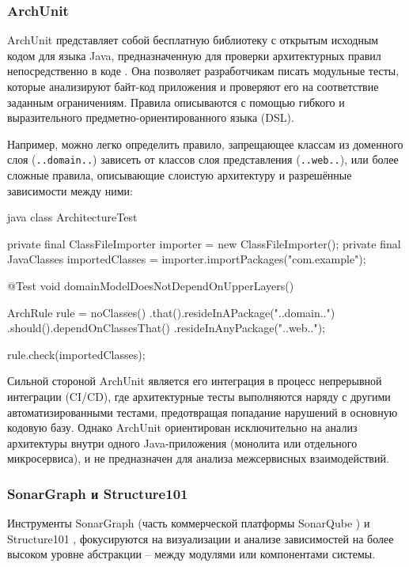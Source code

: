\subsubsection{ArchUnit}

ArchUnit представляет собой бесплатную библиотеку с открытым исходным кодом для языка Java, предназначенную для проверки архитектурных правил непосредственно в коде \cite{archunit-site}. Она позволяет разработчикам писать модульные тесты, которые анализируют байт-код приложения и проверяют его на соответствие заданным ограничениям. Правила описываются с помощью гибкого и выразительного предметно-ориентированного языка (DSL).

Например, можно легко определить правило, запрещающее классам из доменного слоя (\verb|..domain..|) зависеть от классов слоя представления (\verb|..web..|), или более сложные правила, описывающие слоистую архитектуру и разрешённые зависимости между ними:

\begin{code}{java}
class ArchitectureTest {
    private final ClassFileImporter importer = 
            new ClassFileImporter();
    private final JavaClasses importedClasses =
            importer.importPackages("com.example");

    @Test
    void domainModelDoesNotDependOnUpperLayers() {
        ArchRule rule = noClasses()
                .that().resideInAPackage("..domain..")
                .should().dependOnClassesThat()
                .resideInAnyPackage("..web..");

        rule.check(importedClasses);
    }
}
\end{code}

Сильной стороной ArchUnit является его интеграция в процесс непрерывной интеграции (CI/CD), где архитектурные тесты выполняются наряду с другими автоматизированными тестами, предотвращая попадание нарушений в основную кодовую базу. Однако ArchUnit ориентирован исключительно на анализ архитектуры внутри одного Java-приложения (монолита или отдельного микросервиса), и не предназначен для анализа межсервисных взаимодействий.

\subsubsection{SonarGraph и Structure101}

Инструменты SonarGraph (часть коммерческой платформы SonarQube \cite{sonargraph-tool}) и Structure101 \cite{structure101-tool}, фокусируются на визуализации и анализе зависимостей на более высоком уровне абстракции – между модулями или компонентами системы.

